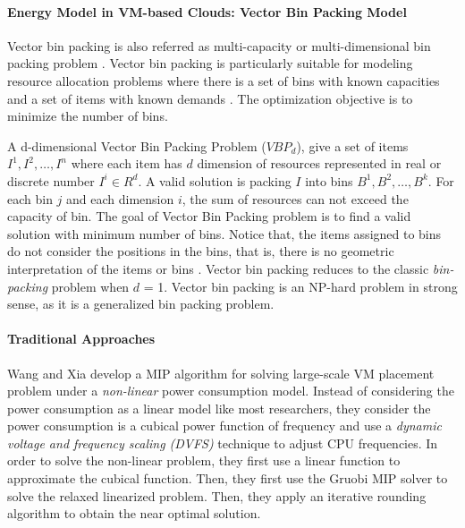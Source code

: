 \paragraph{Energy Model in VM-based Clouds: Vector Bin Packing Model}
\label{sec:vector_bin_packing}
 Vector bin packing is also referred as multi-capacity \cite{Leinberger:1999fs} or multi-dimensional bin packing problem \cite{Xiong:2014jq}. Vector bin packing is particularly suitable for modeling resource allocation problems where there is a set of bins with known capacities and a set of items with known demands \cite{Panigrahy:2011wk}. The optimization objective is to minimize the number of bins.

A d-dimensional Vector Bin Packing Problem ($VBP_d$), give a set of items $I^1, I^2, \dots, I^n$ where each item has $d$ dimension of resources represented in real or discrete number $I^i \in R^d$. A valid solution is packing $I$ into bins $B^1, B^2, \dots, B^k$. For each bin $j$ and each dimension $i$, the sum of resources can not exceed the capacity of bin. The goal of Vector Bin Packing problem is to find a valid solution with minimum number of bins. Notice that, the items assigned to bins do not consider the positions in the bins, that is, there is no geometric interpretation of the items or bins \cite{Johnson:2016wp}.  Vector bin packing reduces to the classic \emph{bin-packing} problem when $d$ = 1. Vector bin packing is an NP-hard problem in strong sense, as it is a generalized bin packing problem.







\paragraph{Traditional Approaches}
 Wang and Xia \cite{Wang:2016eha} develop a MIP algorithm for solving large-scale VM placement problem under a \emph{non-linear} power consumption model.  Instead of considering the power consumption as a linear model like most researchers, they consider the power consumption is a cubical power function of frequency and use a \emph{dynamic voltage and frequency scaling (DVFS)} technique to adjust CPU frequencies. In order to solve the non-linear problem, they first use a linear function to approximate the cubical function. Then, they first use the Gruobi MIP solver to solve the relaxed linearized problem. Then, they apply an iterative rounding algorithm to obtain the near optimal solution.   



